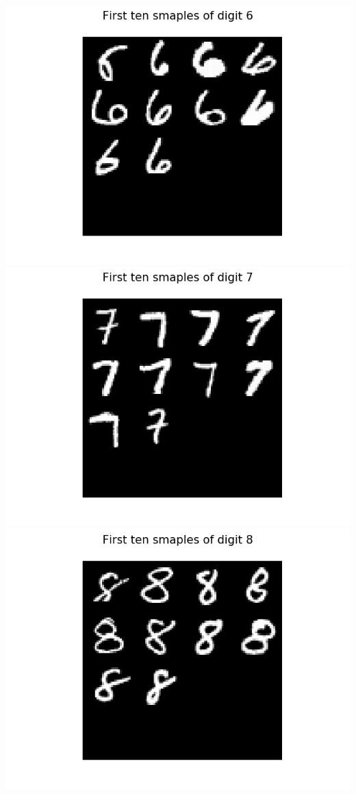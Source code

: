 \documentclass{article}
\begin{document}
    \\
\begin{center}
    \includegraphics[trim=3cm 0 0 0, scale=0.4]{images/task1_1_imgs_class6.png}
    \includegraphics[trim=3cm 0 0 0, scale=0.4]{images/task1_1_imgs_class7.png}
    \includegraphics[trim=3cm 0 3cm 0, scale=0.4]{images/task1_1_imgs_class8.png}
\end{center}
\end{document}
